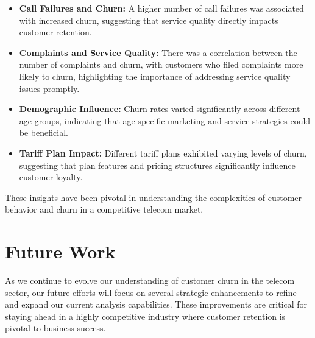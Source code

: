 \documentclass[12pt]{article}
\begin{document}
\begin{itemize}
    \item \textbf{Call Failures and Churn:} A higher number of call failures was associated with increased churn, suggesting that service quality directly impacts customer retention.
    
    \item \textbf{Complaints and Service Quality:} There was a correlation between the number of complaints and churn, with customers who filed complaints more likely to churn, highlighting the importance of addressing service quality issues promptly.
    
    \item \textbf{Demographic Influence:} Churn rates varied significantly across different age groups, indicating that age-specific marketing and service strategies could be beneficial.
    
    \item \textbf{Tariff Plan Impact:} Different tariff plans exhibited varying levels of churn, suggesting that plan features and pricing structures significantly influence customer loyalty.
\end{itemize}

These insights have been pivotal in understanding the complexities of customer behavior and churn in a competitive telecom market.


\section{Future Work}

As we continue to evolve our understanding of customer churn in the telecom sector, our future efforts will focus on several strategic enhancements to refine and expand our current analysis capabilities. These improvements are critical for staying ahead in a highly competitive industry where customer retention is pivotal to business success.
\end{document}
